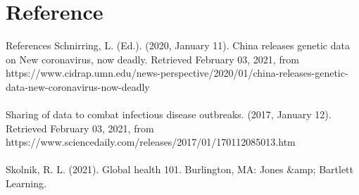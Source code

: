 \documentclass{beamer}
\begin{document}
\section{Reference}
\begin{frame}[allowframebreaks]{References}
Schnirring, L. (Ed.). (2020, January 11). China releases genetic data on New coronavirus, now deadly. Retrieved February 03, 2021, from https://www.cidrap.umn.edu/news-perspective/2020/01/china-releases-genetic-data-new-coronavirus-now-deadly\\ \\Sharing of data to combat infectious disease outbreaks. (2017, January 12). Retrieved February 03, 2021, from https://www.sciencedaily.com/releases/2017/01/170112085013.htm\\ \\Skolnik, R. L. (2021). Global health 101. Burlington, MA: Jones &amp; Bartlett Learning.
\end{frame}
\end{document}
